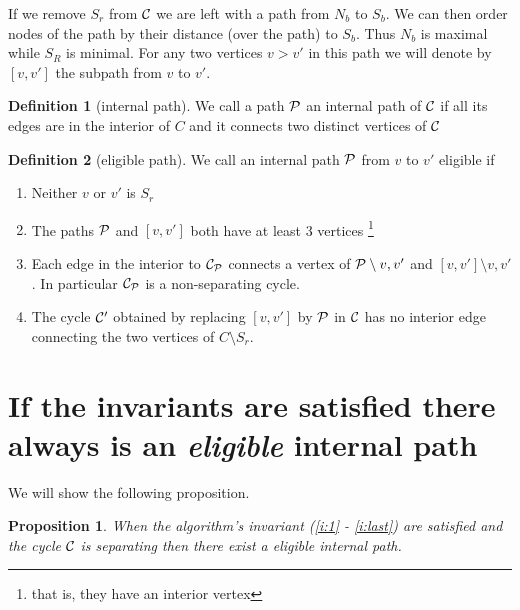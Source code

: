 \documentclass[a4paper]{article}
\newtheorem{prop}[thrm]{Proposition}
\theoremstyle{definition}
\newtheorem*{defi}{Definition}
\begin{document}
If we remove $S_r$ from $\C$ we are left with a path from $N_b$ to $S_b$. We can then order nodes of the path by their distance (over the path)  to $S_b$. Thus $N_b$ is maximal while $S_R$ is minimal. For any two vertices $v > v'$ in this path we will denote by $[v, v']$ the subpath from $v$ to $v'$.

\begin{defi}[internal path]
We call a path $\P$ an internal path of $\C$ if  all its edges are in the interior of $C$ and it connects two distinct vertices of $\C$ 
\end{defi}


\begin{defi}[eligible path]
We call an internal path $\P$ from $v$ to $v'$ eligible if 
\begin{enumerate}
 \renewcommand*{\labelenumi}{(E\arabic{enumi})}%
 \renewcommand*{\theenumi}{(E\arabic{enumi})}%


\item Neither $v$ or $v'$ is $S_r$ \label{e:notSr}
\item The paths $\P$ and $[v,v']$ both have at least 3 vertices \footnote{that is, they have an interior vertex} \label{e:internalVertices}
\item Each edge in the interior to $\C_\P$ connects a vertex of $\P\setminus{v,v'}$ and $[v,v']\setminus{v,v'}$. In particular $\C_\P$ is a non-separating cycle.
\label{e:crossingedge}
\item The cycle $\C'$ obtained by replacing $[v,v']$ by $\P$ in $\C$ has no interior edge connecting the two vertices of $C\setminus{S_r}$.
\label{e:noIntEdgeInC'}
\end{enumerate}
\end{defi}

\section{If the invariants are satisfied there always is an \emph{eligible} internal path}

We will show the following proposition.

\begin{prop}
When the algorithm's invariant (\ref{i:1} - \ref{i:last}) are satisfied and the cycle $\C$ is separating then there exist a \emph{eligible} internal path.
\end{prop}
\end{document}
